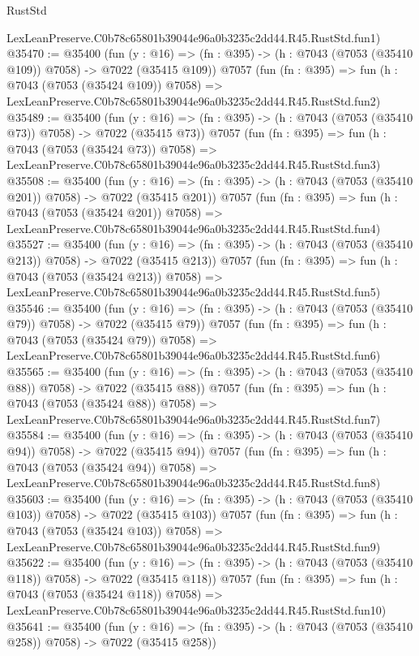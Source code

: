 \begin{lexlean}{RustStd}
\begin{coremodule}
    LexLeanPreserve.C0b78c65801b39044e96a0b3235c2dd44.R45.RustStd.fun1)
@35470 := @35400
    (fun (y : @16) => (fn : @395) -> (h : @7043 (@7053 (@35410 @109)) @7058) -> @7022 (@35415 @109))
    @7057
    (fun (fn : @395) =>
    fun (h : @7043 (@7053 (@35424 @109)) @7058) =>
    LexLeanPreserve.C0b78c65801b39044e96a0b3235c2dd44.R45.RustStd.fun2)
@35489 := @35400
    (fun (y : @16) => (fn : @395) -> (h : @7043 (@7053 (@35410 @73)) @7058) -> @7022 (@35415 @73))
    @7057
    (fun (fn : @395) =>
    fun (h : @7043 (@7053 (@35424 @73)) @7058) =>
    LexLeanPreserve.C0b78c65801b39044e96a0b3235c2dd44.R45.RustStd.fun3)
@35508 := @35400
    (fun (y : @16) => (fn : @395) -> (h : @7043 (@7053 (@35410 @201)) @7058) -> @7022 (@35415 @201))
    @7057
    (fun (fn : @395) =>
    fun (h : @7043 (@7053 (@35424 @201)) @7058) =>
    LexLeanPreserve.C0b78c65801b39044e96a0b3235c2dd44.R45.RustStd.fun4)
@35527 := @35400
    (fun (y : @16) => (fn : @395) -> (h : @7043 (@7053 (@35410 @213)) @7058) -> @7022 (@35415 @213))
    @7057
    (fun (fn : @395) =>
    fun (h : @7043 (@7053 (@35424 @213)) @7058) =>
    LexLeanPreserve.C0b78c65801b39044e96a0b3235c2dd44.R45.RustStd.fun5)
@35546 := @35400
    (fun (y : @16) => (fn : @395) -> (h : @7043 (@7053 (@35410 @79)) @7058) -> @7022 (@35415 @79))
    @7057
    (fun (fn : @395) =>
    fun (h : @7043 (@7053 (@35424 @79)) @7058) =>
    LexLeanPreserve.C0b78c65801b39044e96a0b3235c2dd44.R45.RustStd.fun6)
@35565 := @35400
    (fun (y : @16) => (fn : @395) -> (h : @7043 (@7053 (@35410 @88)) @7058) -> @7022 (@35415 @88))
    @7057
    (fun (fn : @395) =>
    fun (h : @7043 (@7053 (@35424 @88)) @7058) =>
    LexLeanPreserve.C0b78c65801b39044e96a0b3235c2dd44.R45.RustStd.fun7)
@35584 := @35400
    (fun (y : @16) => (fn : @395) -> (h : @7043 (@7053 (@35410 @94)) @7058) -> @7022 (@35415 @94))
    @7057
    (fun (fn : @395) =>
    fun (h : @7043 (@7053 (@35424 @94)) @7058) =>
    LexLeanPreserve.C0b78c65801b39044e96a0b3235c2dd44.R45.RustStd.fun8)
@35603 := @35400
    (fun (y : @16) => (fn : @395) -> (h : @7043 (@7053 (@35410 @103)) @7058) -> @7022 (@35415 @103))
    @7057
    (fun (fn : @395) =>
    fun (h : @7043 (@7053 (@35424 @103)) @7058) =>
    LexLeanPreserve.C0b78c65801b39044e96a0b3235c2dd44.R45.RustStd.fun9)
@35622 := @35400
    (fun (y : @16) => (fn : @395) -> (h : @7043 (@7053 (@35410 @118)) @7058) -> @7022 (@35415 @118))
    @7057
    (fun (fn : @395) =>
    fun (h : @7043 (@7053 (@35424 @118)) @7058) =>
    LexLeanPreserve.C0b78c65801b39044e96a0b3235c2dd44.R45.RustStd.fun10)
@35641 := @35400
    (fun (y : @16) => (fn : @395) -> (h : @7043 (@7053 (@35410 @258)) @7058) -> @7022 (@35415 @258))

\end{coremodule}
\end{lexlean}
